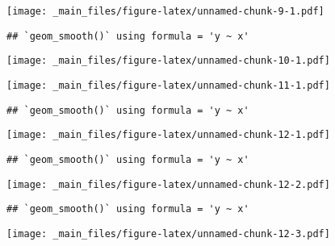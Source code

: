 \documentclass[
]{article}
\begin{document}
\texttt{[image: \_main\_files/figure-latex/unnamed-chunk-9-1.pdf]}

\begin{verbatim}
## `geom_smooth()` using formula = 'y ~ x'
\end{verbatim}

\texttt{[image: \_main\_files/figure-latex/unnamed-chunk-10-1.pdf]}

\texttt{[image: \_main\_files/figure-latex/unnamed-chunk-11-1.pdf]}

\begin{verbatim}
## `geom_smooth()` using formula = 'y ~ x'
\end{verbatim}

\texttt{[image: \_main\_files/figure-latex/unnamed-chunk-12-1.pdf]}

\begin{verbatim}
## `geom_smooth()` using formula = 'y ~ x'
\end{verbatim}

\texttt{[image: \_main\_files/figure-latex/unnamed-chunk-12-2.pdf]}

\begin{verbatim}
## `geom_smooth()` using formula = 'y ~ x'
\end{verbatim}

\texttt{[image: \_main\_files/figure-latex/unnamed-chunk-12-3.pdf]}
\end{document}
